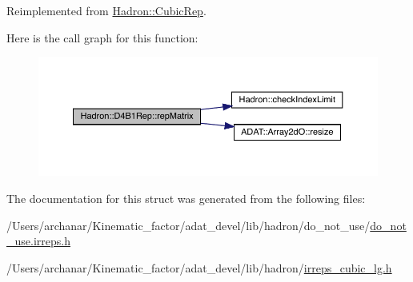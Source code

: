 Reimplemented from \mbox{\hyperlink{structHadron_1_1CubicRep_ac5d7e9e6f4ab1158b5fce3e4ad9e8005}{Hadron\+::\+Cubic\+Rep}}.

Here is the call graph for this function\+:
\nopagebreak
\begin{figure}[H]
\begin{center}
\leavevmode
\includegraphics[width=350pt]{d6/d99/structHadron_1_1D4B1Rep_aaee6044952bae4a4d852115d4e1add07_cgraph}
\end{center}
\end{figure}


The documentation for this struct was generated from the following files\+:\begin{DoxyCompactItemize}
\item 
/\+Users/archanar/\+Kinematic\+\_\+factor/adat\+\_\+devel/lib/hadron/do\+\_\+not\+\_\+use/\mbox{\hyperlink{do__not__use_8irreps_8h}{do\+\_\+not\+\_\+use.\+irreps.\+h}}\item 
/\+Users/archanar/\+Kinematic\+\_\+factor/adat\+\_\+devel/lib/hadron/\mbox{\hyperlink{lib_2hadron_2irreps__cubic__lg_8h}{irreps\+\_\+cubic\+\_\+lg.\+h}}\end{DoxyCompactItemize}
